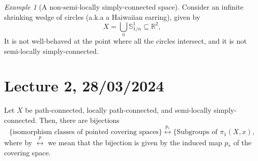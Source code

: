 \documentclass[a4paper]{report}
\theoremstyle{definition}
\theoremstyle{remark}
\theoremstyle{proposition}
\theoremstyle{conjecture}
\theoremstyle{lemma}
\theoremstyle{corollary}
\theoremstyle{exercise}
\newtheorem{example}{Example}
\begin{document}
\begin{example}[A non-semi-locally simply-connected space]
    Consider an infinite shrinking wedge of circles (a.k.a a Haiwaiian earring),
    given by $$X = \bigcup_n \mathbb{S}_{1/n}^1 \subseteq \mathbb{R}^2,$$
    It is not well-behaved at the point where all the circles intersect, and 
    it is not semi-locally simply-connected.
\end{example}

\section{Lecture 2, 28/03/2024}

\begin{theorem}
    Let $X$ be path-connected, locally path-connected, and semi-locally simply-connected.
    Then, there are bijections 
    $$\lbrace \text{isomorphism classes of pointed covering spaces}\rbrace \stackrel{p_\ast}{\longleftrightarrow} \lbrace \text{Subgroups of $\pi_1(X,x)$},$$ 
    where by $\stackrel{p}{\longleftrightarrow}$ we mean that the bijection is given by the induced 
    map $p_\ast$ of the covering space.
\end{theorem}
\end{document}
